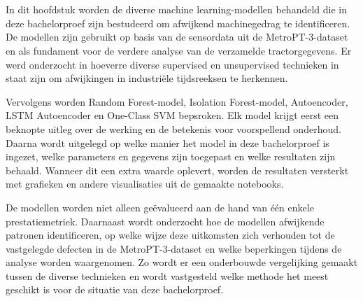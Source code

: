 
\chapter{}%
\label{ch:De ontwikkeling en evaluatie van machine learning anomaliedetectie-modellen}

In dit hoofdstuk worden de diverse machine learning-modellen behandeld die in deze bachelorproef zijn bestudeerd om afwijkend machinegedrag te identificeren. De modellen zijn gebruikt op basis van de sensordata uit de MetroPT-3-dataset en als fundament voor de verdere analyse van de verzamelde tractorgegevens. Er werd onderzocht in hoeverre diverse supervised en unsupervised technieken in staat zijn om afwijkingen in industriële tijdsreeksen te herkennen.

Vervolgens worden Random Forest-model, Isolation Forest-model, Autoencoder, LSTM Autoencoder en One-Class SVM bepsroken. Elk model krijgt eerst een beknopte uitleg over de werking en de betekenis voor voorspellend onderhoud. Daar\-na wordt uitgelegd op welke manier het model in deze bachelorproef is ingezet, welke parameters en gegevens zijn toegepast en welke resultaten zijn behaald. Wanneer dit een extra waarde oplevert, worden de resultaten versterkt met grafieken en andere visualisaties uit de gemaakte notebooks.

De modellen worden niet alleen geëvalueerd aan de hand van één enkele prestatiemetriek. Daarnaast wordt onderzocht hoe de modellen afwijkende patronen identificeren, op welke wijze deze uitkomsten zich verhouden tot de vastgelegde defecten in de MetroPT-3-dataset en welke beperkingen tijdens de analyse worden waargenomen. Zo wordt er een onderbouwde vergelijking gemaakt tussen de diverse technieken en wordt vastgesteld welke methode het meest geschikt is voor de situatie van deze bachelorproef.

\newpage

